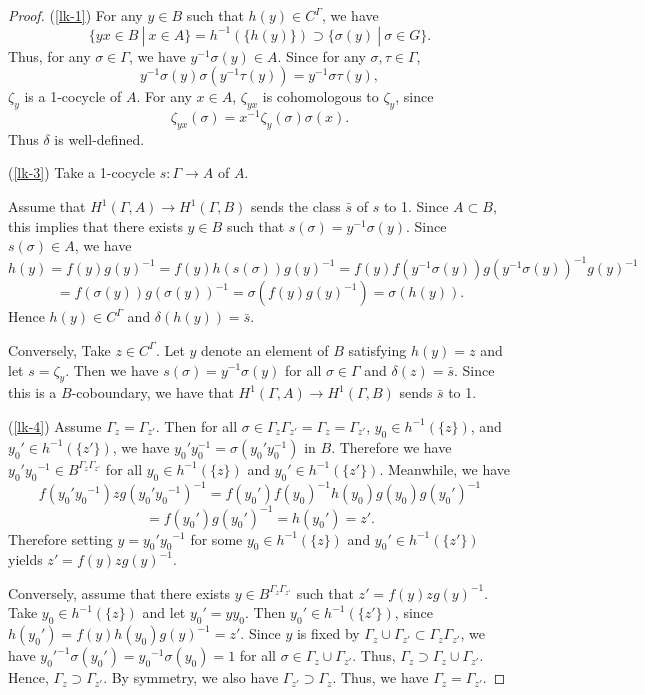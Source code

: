 \documentclass[sn-mathphys-num]{sn-jnl}
\numberwithin{equation}{section}
\theoremstyle{plain}
\theoremstyle{definition}
\begin{document}
\begin{proof}
(\ref{lk-1}) For any $y\in B$ such that $h(y)\in C^\Gamma$, we have
\begin{equation}
\{yx\in B\ |\ x\in A\}=h^{-1}(\{h(y)\})\supset \{\sigma(y)\ |\ \sigma\in G\}.
\end{equation}
Thus, for any $\sigma\in\Gamma$, we have $y^{-1}\sigma(y)\in A$. Since for any $\sigma,\tau\in\Gamma$,
\begin{equation}
y^{-1}\sigma(y)\sigma(y^{-1}\tau(y))=y^{-1}\sigma\tau(y),
\end{equation}
$\zeta_y$ is a 1-cocycle of $A$. For any $x\in A$, $\zeta_{yx}$ is cohomologous to $\zeta_y$, since
\begin{equation}
\zeta_{yx}(\sigma)=x^{-1}\zeta_y(\sigma)\sigma(x).
\end{equation}
Thus $\delta$ is well-defined.

(\ref{lk-3}) Take a 1-cocycle $s:\Gamma\to A$ of $A$.

Assume that $H^1(\Gamma,A)\to H^1(\Gamma,B)$ sends the class $\bar{s}$ of $s$ to 1. Since $A\subset B$, this implies that there exists $y\in B$ such that $s(\sigma)=y^{-1}\sigma(y)$. Since $s(\sigma)\in A$, we have
\[
h(y)=f(y)g(y)^{-1}=f(y)h(s(\sigma))g(y)^{-1}=f(y)f(y^{-1}\sigma(y))g(y^{-1}\sigma(y))^{-1}g(y)^{-1}
\]
\begin{equation}
=f(\sigma(y))g(\sigma(y))^{-1}=\sigma(f(y)g(y)^{-1})=\sigma(h(y)).
\end{equation} 
Hence $h(y)\in C^\Gamma$ and $\delta(h(y))=\bar{s}$.

Conversely, Take $z\in C^\Gamma$. Let $y$ denote an element of $B$ satisfying $h(y)=z$ and let $s=\zeta_y$. Then we have $s(\sigma)=y^{-1}\sigma(y)$ for all $\sigma\in\Gamma$ and $\delta(z)=\bar{s}$. Since this is a $B$-coboundary, we have that $H^1(\Gamma,A)\to H^1(\Gamma,B)$ sends $\bar{s}$ to 1.

(\ref{lk-4})
Assume $\Gamma_z=\Gamma_{z'}$. Then for all $\sigma\in\Gamma_z\Gamma_{z'}=\Gamma_z=\Gamma_{z'}$, $y_0\in h^{-1}(\{z\})$, and $y_0'\in h^{-1}(\{z'\})$, we have $y_0'y_0^{-1}=\sigma(y_0'y_0^{-1})$ in $B$. Therefore we have $y_0'{y_0}^{-1}\in B^{\Gamma_z\Gamma_{z'}}$ for all $y_0\in h^{-1}(\{z\})$ and $y_0'\in h^{-1}(\{z'\})$. Meanwhile, we have
\[
f(y_0'{y_0}^{-1})zg(y_0'{y_0}^{-1})^{-1}=f(y_0')f(y_0)^{-1}h(y_0)g(y_0)g(y_0')^{-1}
\]
\begin{equation}
=f(y_0')g(y_0')^{-1}=h(y_0')=z'.
\end{equation}
Therefore setting $y=y_0'{y_0}^{-1}$ for some $y_0\in h^{-1}(\{z\})$ and $y_0'\in h^{-1}(\{z'\})$ yields $z'=f(y)zg(y)^{-1}$. 

Conversely, assume that there exists $y\in B^{\Gamma_z\Gamma_{z'}}$ such that $z'=f(y)zg(y)^{-1}$. Take $y_0\in h^{-1}(\{z\})$ and let $y_0'=yy_0$. Then $y_0'\in h^{-1}(\{z'\})$, since $h(y_0')=f(y)h(y_0)g(y)^{-1}=z'$. Since $y$ is fixed by $\Gamma_z\cup\Gamma_{z'}\subset\Gamma_z\Gamma_{z'}$, we have ${y_0'}^{-1}\sigma(y_0')={y_0}^{-1}\sigma(y_0)=1$ for all $\sigma\in\Gamma_z\cup\Gamma_{z'}$. Thus, $\Gamma_z\supset\Gamma_z\cup\Gamma_{z'}$. Hence, $\Gamma_z\supset\Gamma_{z'}$. By symmetry, we also have $\Gamma_{z'}\supset\Gamma_z$. Thus, we have $\Gamma_z=\Gamma_{z'}$.
\end{proof}
\end{document}
